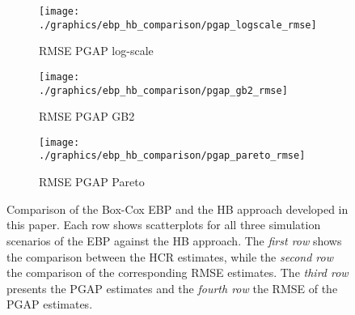 \begin{figure}
    \begin{subfigure}{0.31\linewidth}
        \centering
        \texttt{[image: ./graphics/ebp\_hb\_comparison/pgap\_logscale\_rmse]}
        \caption{RMSE PGAP log-scale}
    \end{subfigure}
    \begin{subfigure}{0.31\linewidth}
        \centering
        \texttt{[image: ./graphics/ebp\_hb\_comparison/pgap\_gb2\_rmse]}
        \caption{RMSE PGAP GB2}
    \end{subfigure}
    \begin{subfigure}{0.31\linewidth}
        \centering
        \texttt{[image: ./graphics/ebp\_hb\_comparison/pgap\_pareto\_rmse]}
        \caption{RMSE PGAP Pareto}
    \end{subfigure}
    \caption[Comparison of EBP and HB approaches with simulated data.]{Comparison of the Box-Cox EBP and the HB approach developed in this paper. Each row shows scatterplots for all three simulation scenarios of the EBP against the HB approach. The \textit{first row} shows the comparison between the HCR estimates, while the \textit{second row} the comparison of the corresponding RMSE estimates. The \textit{third row} presents the PGAP estimates and the \textit{fourth row} the RMSE of the PGAP estimates.}
    \label{fig:ebp_hb_comparison}
\end{figure}


